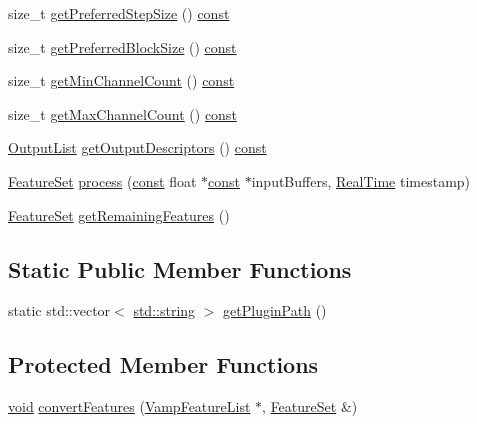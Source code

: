 \begin{DoxyCompactItemize}
\item 
size\+\_\+t \hyperlink{class_vamp_1_1_plugin_host_adapter_a859ad5d59402691daed3cf1af1899ebe}{get\+Preferred\+Step\+Size} () \hyperlink{getopt1_8c_a2c212835823e3c54a8ab6d95c652660e}{const} 
\item 
size\+\_\+t \hyperlink{class_vamp_1_1_plugin_host_adapter_ad5e0ea8042bdec4dd18428991117e07a}{get\+Preferred\+Block\+Size} () \hyperlink{getopt1_8c_a2c212835823e3c54a8ab6d95c652660e}{const} 
\item 
size\+\_\+t \hyperlink{class_vamp_1_1_plugin_host_adapter_a67d1198c0e58d3f0076d0eda599ff28d}{get\+Min\+Channel\+Count} () \hyperlink{getopt1_8c_a2c212835823e3c54a8ab6d95c652660e}{const} 
\item 
size\+\_\+t \hyperlink{class_vamp_1_1_plugin_host_adapter_a25091905e97e39d515d8ffc1a9f2b9e0}{get\+Max\+Channel\+Count} () \hyperlink{getopt1_8c_a2c212835823e3c54a8ab6d95c652660e}{const} 
\item 
\hyperlink{class_vamp_1_1_plugin_a30f531b8fb69fac41a24e3d2a6a08ed9}{Output\+List} \hyperlink{class_vamp_1_1_plugin_host_adapter_ae02670cca9d25cdc4100cbe7a12e3e68}{get\+Output\+Descriptors} () \hyperlink{getopt1_8c_a2c212835823e3c54a8ab6d95c652660e}{const} 
\item 
\hyperlink{class_vamp_1_1_plugin_a448fb57dc245d47923ec9eeaf9856c5f}{Feature\+Set} \hyperlink{class_vamp_1_1_plugin_host_adapter_a82c29a512c0587ea0121eee4b0c2a684}{process} (\hyperlink{getopt1_8c_a2c212835823e3c54a8ab6d95c652660e}{const} float $\ast$\hyperlink{getopt1_8c_a2c212835823e3c54a8ab6d95c652660e}{const} $\ast$input\+Buffers, \hyperlink{struct_vamp_1_1_real_time}{Real\+Time} timestamp)
\item 
\hyperlink{class_vamp_1_1_plugin_a448fb57dc245d47923ec9eeaf9856c5f}{Feature\+Set} \hyperlink{class_vamp_1_1_plugin_host_adapter_ad3f5f16a89a821da2ec1186fd2062e83}{get\+Remaining\+Features} ()
\end{DoxyCompactItemize}
\subsection*{Static Public Member Functions}
\begin{DoxyCompactItemize}
\item 
static std\+::vector$<$ \hyperlink{test__lib_f_l_a_c_2format_8c_ab02026ad0de9fb6c1b4233deb0a00c75}{std\+::string} $>$ \hyperlink{class_vamp_1_1_plugin_host_adapter_a08d7ed3a11bf4a3c30fa0f9b41a0fed6}{get\+Plugin\+Path} ()
\end{DoxyCompactItemize}
\subsection*{Protected Member Functions}
\begin{DoxyCompactItemize}
\item 
\hyperlink{sound_8c_ae35f5844602719cf66324f4de2a658b3}{void} \hyperlink{class_vamp_1_1_plugin_host_adapter_aee417a4c9ba9dbb63777c963d5f9452a}{convert\+Features} (\hyperlink{vamp_8h_a5f257e3f8b5ca1ca4c159d486e219078}{Vamp\+Feature\+List} $\ast$, \hyperlink{class_vamp_1_1_plugin_a448fb57dc245d47923ec9eeaf9856c5f}{Feature\+Set} \&)
\end{DoxyCompactItemize}
